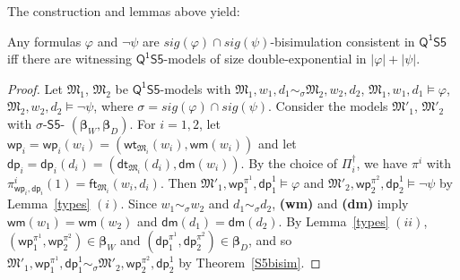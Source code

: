 \documentclass{lmcs} %
\theoremstyle{plain}\newtheorem{satz}[thm]{Satz} %
\newcommand{\sig}{\mathit{sig}}
\newcommand{\FOMS}{\ensuremath{\mathsf{Q^1S5}}}
\newcommand{\BS}{$\mathsf{S5}$-\text{bisimulation}}
\newcommand{\wt}{\mathsf{wt}}
\newcommand{\dt}{\mathsf{dt}}
\newcommand{\ft}{\mathsf{ft}}
\newcommand{\wm}{\mathsf{wm}}
\newcommand{\dm}{\mathsf{dm}}
\newcommand{\iwp}{\mathsf{wp}_i}
\newcommand{\idp}{\mathsf{dp}_i}
\newcommand{\owp}{\mathsf{wp}_1}
\newcommand{\twp}{\mathsf{wp}_2}
\newcommand{\odp}{\mathsf{dp}_1}
\newcommand{\tdp}{\mathsf{dp}_2}
\newcommand{\bs}{\boldsymbol{\beta}}
\newcommand{\fform}[1]{\boldsymbol{#1}}
\newcommand{\pvar}{\fform{p}}
\begin{document}
%
%

The construction and lemmas above yield:

\begin{thm}\label{th:sizebound}
Any formulas $\varphi$ and $\neg\psi$ are $\sig(\varphi) \cap \sig(\psi)$-bisimulation consistent in $\FOMS$ iff there are witnessing $\FOMS$-models of size double-exponential in $|\varphi|+|\psi|$.
\end{thm}
%
\begin{proof}
	Let $\mathfrak M_1$, $\mathfrak M_2$ be 
	$\FOMS$-models with	
	$\mathfrak{M}_{1},w_{1},d_{1} \sim_{\sigma} \mathfrak{M}_{2},w_{2},d_{2}$, $\mathfrak{M}_{1},w_{1}, d_1 \models \varphi$, $\mathfrak{M}_{2},w_{2}, d_2 \models\neg \psi$, where $\sigma = \sig(\varphi) \cap \sig(\psi)$.  Consider the models $\mathfrak{M}'_{1}$, $\mathfrak{M}'_{2}$ with 
$\sigma$-\BS{} $(\bs_W,\bs_D)$. For $i=1,2$, let $\iwp =\iwp(w_i) = (\wt_{\mathfrak M_i}(w_i), \wm(w_i))$ and let $\idp =\idp(d_i) = (\dt_{\mathfrak M_i}(d_i), \dm(w_i))$. By the choice of $\Pi_{i}^{\dag}$, we have $\pi^i$ with $\pi^i_{\iwp,\idp}(1) = \ft_{\mathfrak M_i}(w_i,d_i)$. Then $\mathfrak M'_1, \owp^{\pi^1}, \odp^1 \models \varphi$ and $\mathfrak M'_2, \twp^{\pi^2}, \tdp^1 \models\neg \psi$ by Lemma~\ref{types} $(i)$. Since $w_1 \sim_\sigma w_2$ and $d_1 \sim_\sigma d_2$, {\bf (wm)} and {\bf (dm)} imply $\wm(w_1) = \wm(w_2)$ and $\dm(d_1) = \dm(d_2)$. By Lemma~\ref{types} $(ii)$, $(\owp^{\pi^1},\twp^{\pi^2}) \in \bs_W$ and $ (\odp^{\pi^1},\tdp^{\pi^2}) \in \bs_D$, and so $\mathfrak M'_1, \owp^{\pi^1}, \odp^1 \sim_\sigma \mathfrak M'_2, \twp^{\pi^2}, \tdp^1$ by Theorem~\ref{S5bisim}.
\end{proof}
\end{document}

